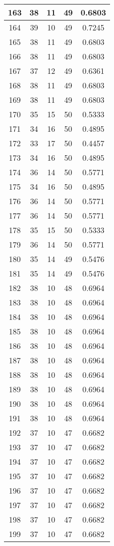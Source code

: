 \documentclass[letterpaper, 12pt]{article}
\begin{document}
\begin{longtable}{|c|c|c|c|c|}
\hline
163 & 38 & 11 & 49 & 0.6803 \\
\hline
164 & 39 & 10 & 49 & 0.7245 \\
\hline
165 & 38 & 11 & 49 & 0.6803 \\
\hline
166 & 38 & 11 & 49 & 0.6803 \\
\hline
167 & 37 & 12 & 49 & 0.6361 \\
\hline
168 & 38 & 11 & 49 & 0.6803 \\
\hline
169 & 38 & 11 & 49 & 0.6803 \\
\hline
170 & 35 & 15 & 50 & 0.5333 \\
\hline
171 & 34 & 16 & 50 & 0.4895 \\
\hline
172 & 33 & 17 & 50 & 0.4457 \\
\hline
173 & 34 & 16 & 50 & 0.4895 \\
\hline
174 & 36 & 14 & 50 & 0.5771 \\
\hline
175 & 34 & 16 & 50 & 0.4895 \\
\hline
176 & 36 & 14 & 50 & 0.5771 \\
\hline
177 & 36 & 14 & 50 & 0.5771 \\
\hline
178 & 35 & 15 & 50 & 0.5333 \\
\hline
179 & 36 & 14 & 50 & 0.5771 \\
\hline
180 & 35 & 14 & 49 & 0.5476 \\
\hline
181 & 35 & 14 & 49 & 0.5476 \\
\hline
182 & 38 & 10 & 48 & 0.6964 \\
\hline
183 & 38 & 10 & 48 & 0.6964 \\
\hline
184 & 38 & 10 & 48 & 0.6964 \\
\hline
185 & 38 & 10 & 48 & 0.6964 \\
\hline
186 & 38 & 10 & 48 & 0.6964 \\
\hline
187 & 38 & 10 & 48 & 0.6964 \\
\hline
188 & 38 & 10 & 48 & 0.6964 \\
\hline
189 & 38 & 10 & 48 & 0.6964 \\
\hline
190 & 38 & 10 & 48 & 0.6964 \\
\hline
191 & 38 & 10 & 48 & 0.6964 \\
\hline
192 & 37 & 10 & 47 & 0.6682 \\
\hline
193 & 37 & 10 & 47 & 0.6682 \\
\hline
194 & 37 & 10 & 47 & 0.6682 \\
\hline
195 & 37 & 10 & 47 & 0.6682 \\
\hline
196 & 37 & 10 & 47 & 0.6682 \\
\hline
197 & 37 & 10 & 47 & 0.6682 \\
\hline
198 & 37 & 10 & 47 & 0.6682 \\
\hline
199 & 37 & 10 & 47 & 0.6682 \\
\hline
\end{longtable}
\end{document}
